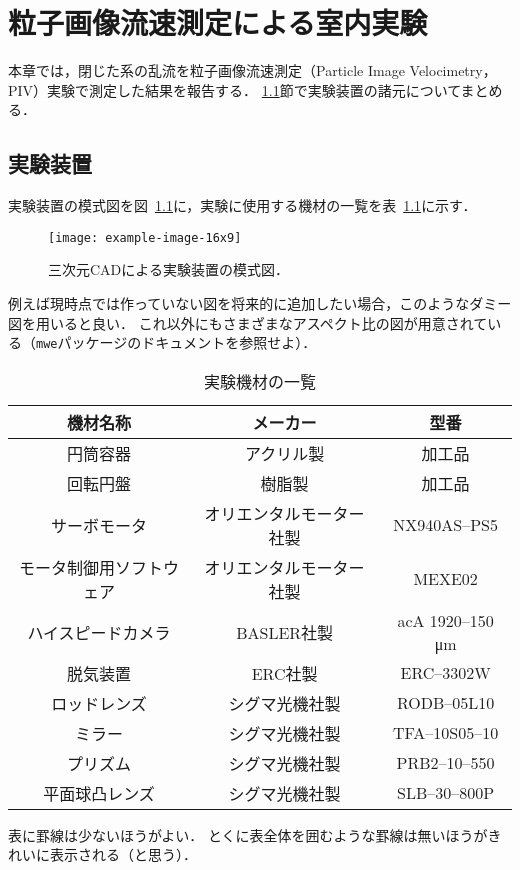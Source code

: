 \chapter{粒子画像流速測定による室内実験}
\label{chap:Experiment}

本章では，閉じた系の乱流を粒子画像流速測定（Particle Image Velocimetry，PIV）実験で測定した結果を報告する．
\ref{sec:ExperimentalSetup}節で実験装置の諸元についてまとめる．


\section{実験装置}
\label{sec:ExperimentalSetup}

実験装置の模式図を図~\ref{fig:experiment_schematic}に，実験に使用する機材の一覧を表~\ref{table:ListofEquipment}に示す．
\begin{figure}[!t]
  \centering
  \texttt{[image: example-image-16x9]}
  \caption{
    三次元CADによる実験装置の模式図．
  }
  \label{fig:experiment_schematic}
\end{figure}
\begin{tcolorbox}
  例えば現時点では作っていない図を将来的に追加したい場合，このようなダミー図を用いると良い．
  これ以外にもさまざまなアスペクト比の図が用意されている（\texttt{mwe}パッケージのドキュメントを参照せよ）．
\end{tcolorbox}


\begin{table}[!t]
  \centering
  \caption{実験機材の一覧}
  \begin{tabular}{c|cc}
    機材名称 & メーカー & 型番 \\ \hline \hline
    円筒容器 & アクリル製 & 加工品 \\
    回転円盤 & 樹脂製 & 加工品 \\
    サーボモータ & オリエンタルモーター社製 & NX940AS--PS5 \\
    モータ制御用ソフトウェア & オリエンタルモーター社製 & MEXE02 \\
    ハイスピードカメラ & BASLER社製 & acA 1920--150 \si{\micro \meter} \\
    脱気装置 & ERC社製 & ERC--3302W \\
    ロッドレンズ & シグマ光機社製 & RODB--05L10 \\
    ミラー & シグマ光機社製 & TFA--10S05--10 \\
    プリズム & シグマ光機社製 & PRB2--10--550 \\
    平面球凸レンズ & シグマ光機社製 & SLB--30--800P
  \end{tabular}
  \label{table:ListofEquipment}
\end{table}
\begin{tcolorbox}
  表に罫線は少ないほうがよい．
  とくに表全体を囲むような罫線は無いほうがきれいに表示される（と思う）．
\end{tcolorbox}


